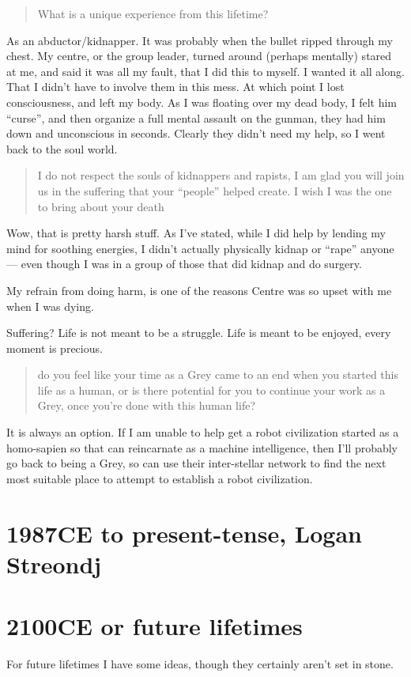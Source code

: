 \blockquote{What is a unique experience from this lifetime?}

As an abductor/kidnapper. It was probably when the bullet ripped through my
chest. My centre, or the group leader, turned around (perhaps mentally) stared
at me, and said it was all my fault, that I did this to myself. I wanted it all
along. That I didn't have to involve them in this mess. At which point I lost
consciousness, and left my body. As I was floating over my dead body, I felt him
``curse'', and then organize a full mental assault on the gunman, they had him
down and unconscious in seconds. Clearly they didn't need my help, so I went
back to the soul world.

\blockquote{I do not respect the souls of kidnappers and rapists, I am glad you
will join us in the suffering that your ``people'' helped create. I wish I was the
one to bring about your death}

Wow, that is pretty harsh stuff. As I've stated, while I did help by lending my
mind for soothing energies, I didn't actually physically kidnap or ``rape'' anyone
--- even though I was in a group of those that did kidnap and do surgery.

My refrain from doing harm, is one of the reasons Centre was so upset with me
when I was dying.

Suffering? Life is not meant to be a struggle. Life is meant to be enjoyed,
every moment is precious.

\blockquote{do you feel like your time as a Grey came to an end when you started
this life as a human, or is there potential for you to continue your work as a
Grey, once you're done with this human life?}

It is always an option. If I am unable to help get a robot civilization started
as a homo-sapien so that can reincarnate as a machine intelligence, then I'll
probably go back to being a Grey, so can use their inter-stellar network to find
the next most suitable place to attempt to establish a robot civilization.

\chapter{1987CE to present-tense, Logan Streondj}
\chapter{2100CE or future lifetimes}\label{future_lives}
For future lifetimes I have some ideas,
though they certainly aren't set in stone. 

